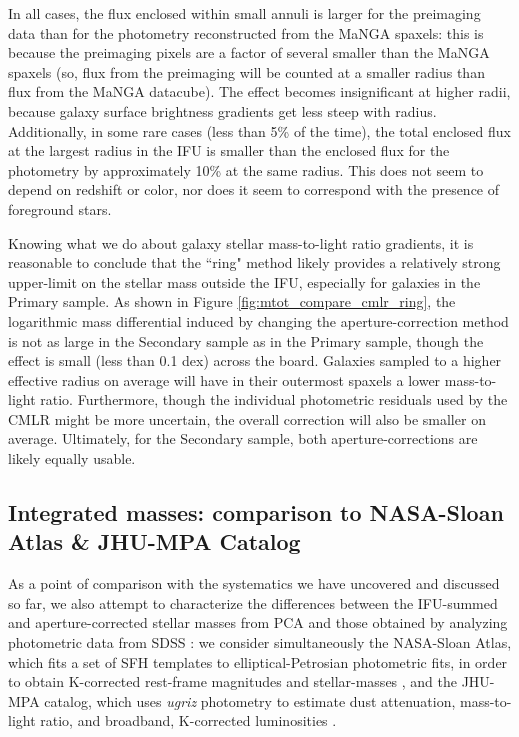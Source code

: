 In all cases, the flux enclosed within small annuli is larger for the preimaging data than for the photometry reconstructed from the MaNGA spaxels: this is because the preimaging pixels are a factor of several smaller than the MaNGA spaxels (so, flux from the preimaging will be counted at a smaller radius than flux from the MaNGA datacube). The effect becomes insignificant at higher radii, because galaxy surface brightness gradients get less steep with radius. Additionally, in some rare cases (less than 5\% of the time), the total enclosed flux at the largest radius in the IFU is smaller than the enclosed flux for the photometry by approximately 10\% at the same radius. This does not seem to depend on redshift or color, nor does it seem to correspond with the presence of foreground stars.

Knowing what we do about galaxy stellar mass-to-light ratio gradients, it is reasonable to conclude that the ``ring" method likely provides a relatively strong upper-limit on the stellar mass outside the IFU, especially for galaxies in the Primary sample. As shown in Figure \ref{fig:mtot_compare_cmlr_ring}, the logarithmic mass differential induced by changing the aperture-correction method is not as large in the Secondary sample as in the Primary sample, though the effect is small (less than 0.1 dex) across the board. Galaxies sampled to a higher effective radius on average will have in their outermost spaxels a lower mass-to-light ratio. Furthermore, though the individual photometric residuals used by the CMLR might be more uncertain, the overall correction will also be smaller on average. Ultimately, for the Secondary sample, both aperture-corrections are likely equally usable.

\subsection{Integrated masses: comparison to NASA-Sloan Atlas \& JHU-MPA Catalog}
\label{chap2:sec:photometry}

As a point of comparison with the systematics we have uncovered and discussed so far, we also attempt to characterize the differences between the IFU-summed and aperture-corrected stellar masses from PCA and those obtained by analyzing photometric data from SDSS \citep{sdss_summary}: we consider simultaneously the NASA-Sloan Atlas, which fits a set of SFH templates to elliptical-Petrosian photometric fits, in order to obtain K-corrected rest-frame magnitudes and stellar-masses \citep{blanton_11_nsa, blanton_roweis_07_software}, and the JHU-MPA catalog, which uses \textit{ugriz} photometry to estimate dust attenuation, mass-to-light ratio, and broadband, K-corrected luminosities \citep{kauffmann_heckman_white_03, salim_rich_charlot_07, sdss_dr8_2011}. 

